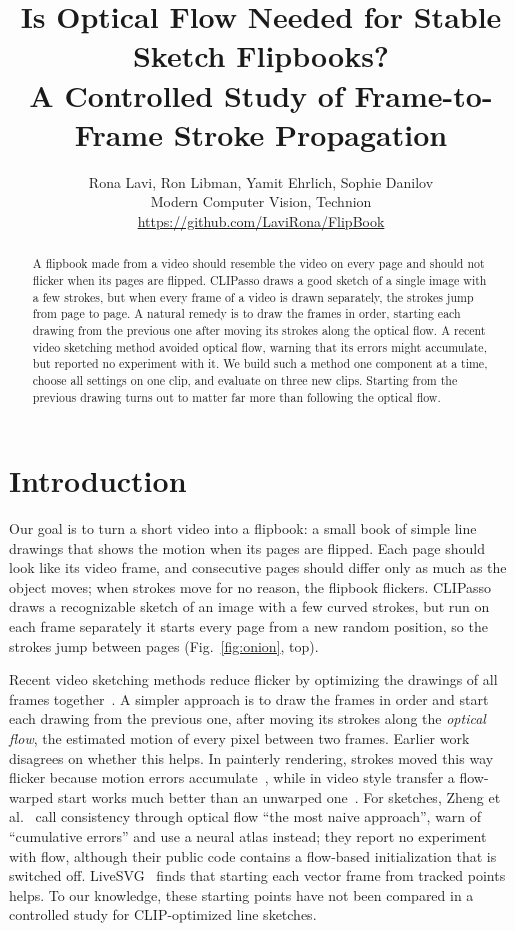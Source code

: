 \documentclass[10pt,twocolumn]{article}
\title{\vspace{-3ex}Is Optical Flow Needed for Stable Sketch Flipbooks?\\A Controlled Study of Frame-to-Frame Stroke Propagation}
\author{Rona Lavi, Ron Libman, Yamit Ehrlich, Sophie Danilov \\ Modern Computer Vision, Technion \\ \small\url{https://github.com/LaviRona/FlipBook}}
\date{\vspace{-5ex}}
\begin{document}
\maketitle

\begin{abstract}
A flipbook made from a video should resemble the video on every page and should not flicker when its pages are
flipped. CLIPasso draws a good sketch of a single image with a few strokes, but when every frame of a video is drawn
separately, the strokes jump from page to page. A natural remedy is to draw the frames in order, starting each drawing
from the previous one after moving its strokes along the optical flow. A recent video sketching method avoided optical
flow, warning that its errors might accumulate, but reported no experiment with it. We build such a method one component at a time,
choose all settings on one clip, and evaluate on three new clips. Starting from the previous drawing turns out to
matter far more than following the optical flow.
\end{abstract}

\section{Introduction}
Our goal is to turn a short video into a flipbook: a small book of simple line drawings that shows the motion when its
pages are flipped. Each page should look like its video frame, and consecutive pages should differ only as much as the
object moves; when strokes move for no reason, the flipbook flickers. CLIPasso~\citep{vinker2022clipasso} draws a
recognizable sketch of an image with a few curved strokes, but run on each frame separately it starts every page from
a new random position, so the strokes jump between pages (Fig.~\ref{fig:onion}, top).

Recent video sketching methods reduce flicker by optimizing the drawings of all frames
together~\citep{zheng2024sketchvideo,fang2025video,zhu2025vector,zhu2026hypersketch}. A simpler approach is to draw the
frames in order and start each drawing from the previous one, after moving its strokes along the \emph{optical flow},
the estimated motion of every pixel between two frames. Earlier work disagrees on whether this helps. In painterly
rendering, strokes moved this way~\citep{litwinowicz1997processing,hertzmann2000painterly} flicker because motion errors
accumulate~\citep{collomosse2004mid}, while in video style transfer a flow-warped start works much better than an
unwarped one~\citep{ruder2016artistic}. For sketches, Zheng et al.~\citep{zheng2024sketchvideo} call consistency through
optical flow ``the most naive approach'', warn of ``cumulative errors'' and use a neural atlas instead; they report no
experiment with flow, although their public code contains a flow-based initialization that is switched off.
LiveSVG~\citep{levy2026livesvg}
finds that starting each vector frame from tracked points helps. To our knowledge, these starting points have not been
compared in a controlled study for CLIP-optimized line sketches.
\end{document}

